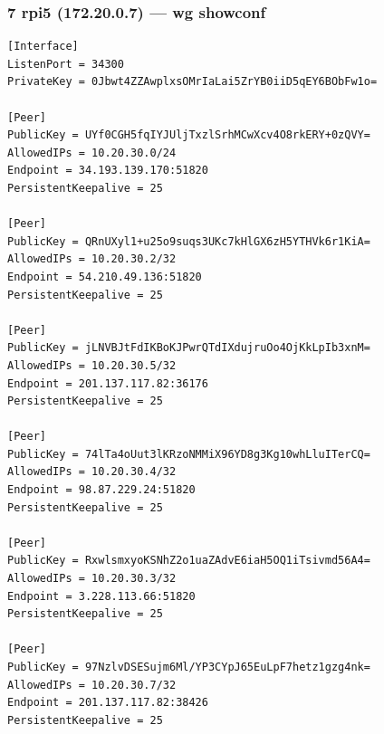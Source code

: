 \documentclass[11pt,a4paper]{article}
\begin{document}
\subsubsection*{7 rpi5 (172.20.0.7) — wg showconf}
\begin{lstlisting}
[Interface]
ListenPort = 34300
PrivateKey = 0Jbwt4ZZAwplxsOMrIaLai5ZrYB0iiD5qEY6BObFw1o=

[Peer]
PublicKey = UYf0CGH5fqIYJUljTxzlSrhMCwXcv4O8rkERY+0zQVY=
AllowedIPs = 10.20.30.0/24
Endpoint = 34.193.139.170:51820
PersistentKeepalive = 25

[Peer]
PublicKey = QRnUXyl1+u25o9suqs3UKc7kHlGX6zH5YTHVk6r1KiA=
AllowedIPs = 10.20.30.2/32
Endpoint = 54.210.49.136:51820
PersistentKeepalive = 25

[Peer]
PublicKey = jLNVBJtFdIKBoKJPwrQTdIXdujruOo4OjKkLpIb3xnM=
AllowedIPs = 10.20.30.5/32
Endpoint = 201.137.117.82:36176
PersistentKeepalive = 25

[Peer]
PublicKey = 74lTa4oUut3lKRzoNMMiX96YD8g3Kg10whLluITerCQ=
AllowedIPs = 10.20.30.4/32
Endpoint = 98.87.229.24:51820
PersistentKeepalive = 25

[Peer]
PublicKey = RxwlsmxyoKSNhZ2o1uaZAdvE6iaH5OQ1iTsivmd56A4=
AllowedIPs = 10.20.30.3/32
Endpoint = 3.228.113.66:51820
PersistentKeepalive = 25

[Peer]
PublicKey = 97NzlvDSESujm6Ml/YP3CYpJ65EuLpF7hetz1gzg4nk=
AllowedIPs = 10.20.30.7/32
Endpoint = 201.137.117.82:38426
PersistentKeepalive = 25

\end{lstlisting}
\end{document}
